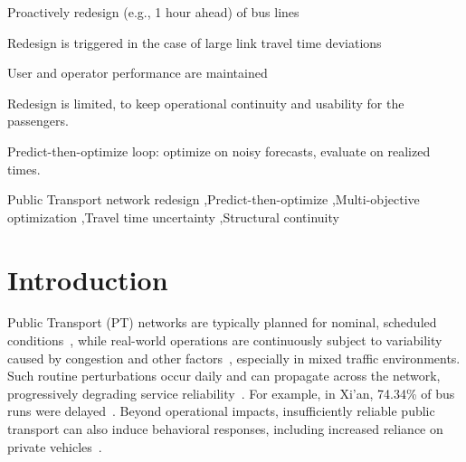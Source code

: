 \documentclass[a4paper,fleqn]{cas-sc}
\begin{document}

\begin{highlights}
\item Proactively redesign (e.g., 1 hour ahead) of bus lines
\item Redesign is triggered in the case of large link travel time deviations
\item User and operator performance are maintained
\item Redesign is limited, to keep operational continuity and usability for the passengers.
\item Predict-then-optimize loop: optimize on noisy forecasts, evaluate on realized times.
\end{highlights}


\begin{keywords}
Public Transport network redesign \sep Predict-then-optimize \sep Multi-objective optimization \sep Travel time uncertainty  \sep Structural continuity
\end{keywords}

\maketitle

\section{Introduction}

Public Transport (PT) networks are typically planned for nominal, scheduled conditions~\citep{ibarra2015planning}, while real-world operations are continuously subject to variability caused by congestion and other factors~\citep{buchel2020review, danaher2020minutes}, especially in mixed traffic environments. Such routine perturbations occur daily and can propagate across the network, progressively degrading service reliability~\citep{marra2020delay}. For example, in Xi’an, 74.34\% of bus runs were delayed~\citep{zhang2022travel}. 
Beyond operational impacts, insufficiently reliable public transport can also induce behavioral responses, including increased reliance on private vehicles~\citep{rodier2025evaluation}.
\end{document}
